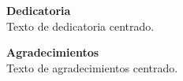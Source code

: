 \thispagestyle{empty}



\begin{center}
    \textbf{Dedicatoria}\\
    Texto de dedicatoria centrado.

    
    \vspace{2cm}

    
    \textbf{Agradecimientos}\\
    Texto de agradecimientos centrado.    
\end{center}